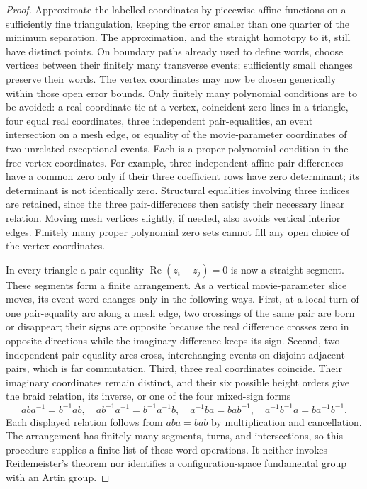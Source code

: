 \documentclass[11pt,a4paper]{article}
\theoremstyle{remark}
\begin{document}
\begin{proof}
Approximate the labelled coordinates by piecewise-affine functions on a
sufficiently fine triangulation, keeping the error smaller than one
quarter of the minimum separation.  The approximation, and the straight
homotopy to it, still have distinct points.  On boundary paths already
used to define words, choose vertices between their finitely many
transverse events; sufficiently small changes preserve their words.
The vertex coordinates may now be chosen generically within those open
error bounds.  Only finitely many polynomial conditions are to be
avoided: a real-coordinate tie at a vertex, coincident zero lines in a
triangle, four equal real coordinates, three independent pair-equalities,
an event intersection on a mesh edge, or equality of the movie-parameter
coordinates of two unrelated exceptional events.  Each is a proper
polynomial condition in the free vertex coordinates.  For example,
three independent affine pair-differences have a common zero only if
their three coefficient rows have zero determinant; its determinant is
not identically zero.  Structural equalities involving three indices
are retained, since the three pair-differences then satisfy their
necessary linear relation.  Moving mesh vertices slightly, if needed,
also avoids vertical interior edges.  Finitely many proper polynomial
zero sets cannot fill any open choice of the vertex coordinates.

In every triangle a pair-equality
$\operatorname{Re}(z_i-z_j)=0$ is now a straight segment.  These segments
form a finite arrangement.  As a vertical movie-parameter slice moves,
its event word changes only in the following ways.
First, at a local turn of one pair-equality arc along a mesh edge,
two crossings of the same pair are born or disappear; their signs are
opposite because the real difference crosses zero in opposite
directions while the imaginary difference keeps its sign.  Second,
two independent pair-equality arcs cross, interchanging events on
disjoint adjacent pairs, which is far commutation.  Third, three real
coordinates coincide.  Their imaginary coordinates remain distinct,
and their six possible height orders give the braid relation, its
inverse, or one of the four mixed-sign forms
\[
 aba^{-1}=b^{-1}ab,\quad
 ab^{-1}a^{-1}=b^{-1}a^{-1}b,\quad
 a^{-1}ba=bab^{-1},\quad
 a^{-1}b^{-1}a=ba^{-1}b^{-1}.
\]
Each displayed relation follows from $aba=bab$ by multiplication and
cancellation.  The arrangement has finitely many segments, turns, and
intersections, so this procedure supplies a finite list of these word
operations.  It neither invokes Reidemeister's theorem nor identifies a
configuration-space fundamental group with an Artin group.


\end{proof}
\end{document}
